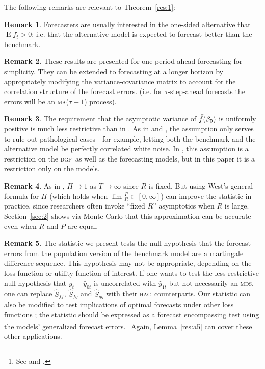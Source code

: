\documentclass[11pt,fleqn]{article}
\theoremstyle{definition}
\newtheorem{rem}{Remark}
\DeclareMathOperator{\E}{E}
\newcommand{\btrue}[1][]{\if#1*\hat\beta_{T+1}\else\beta_0\fi}
\newcommand{\dgp}{\textsc{dgp}}
\newcommand{\hac}{\textsc{hac}}
\newcommand{\ma}{\textsc{ma}}
\newcommand{\mds}{\textsc{mds}}
\begin{document}
The following remarks are relevant to Theorem~\ref{res:1}:

\begin{rem}
  Forecasters are usually interested in the one-sided alternative that
  $\E f_t > 0$; i.e. that the alternative model is expected
  to forecast better than the benchmark.
\end{rem}

\begin{rem}
  These results are presented for one-period-ahead forecasting for
  simplicity.  They can be extended to forecasting at a longer horizon
  by appropriately modifying the variance-covariance matrix to account
  for the correlation structure of the forecast errors. (i.e. for
  $\tau$-step-ahead forecasts the errors will be an \ma($\tau-1$) process).
\end{rem}

\begin{rem}
  The requirement that the asymptotic variance of $\bar f(\btrue)$ is
  uniformly positive is much less restrictive than in \cite{Wes:96}.
  As in \cite{GiW:06} and \citet{ClW:06,ClW:07}, the assumption only
  serves to rule out pathological cases---for example, letting both
  the benchmark and the alternative model be perfectly correlated white noise. In
  \citet{Wes:96}, this assumption is a restriction on the \dgp\ as
  well as the forecasting models, but in this paper it is a
  restriction only on the models.
\end{rem}

\begin{rem}
  As in \citet{Wes:96}, $\Pi \to 1$ as $T \to \infty$ since $R$ is
  fixed.  But using West's general formula for $\Pi$ (which holds when
  $\lim \tfrac{P}{R} \in [0,\infty]$) can improve the statistic in practice,
  since researchers often invoke ``fixed $R$'' asymptotics when $R$ is
  large.  Section~\ref{sec:2} shows via Monte Carlo that this
  approximation can be accurate even when $R$ and $P$ are equal.
\end{rem}

\begin{rem}
  The statistic we present tests the null hypothesis that the forecast
  errors from the population version of the benchmark model are a
  martingale difference sequence.  This hypothesis may not be
  appropriate, depending on the loss function or utility function of
  interest.  If one wants to test the less restrictive null hypothesis that
  $y_{t} - \hat{y}_{0t}$ is uncorrelated with $\hat{y}_{1t}$ but not
  necessarily an \mds, one can replace $\hat{S}_{ff}$, $\hat{S}_{fg}$
  and $\hat{S}_{gg}$ with their \hac\ counterparts.  
  Our statistic can also be modified to test implications of
  optimal forecasts under other loss functions
  \citep[see][]{PaT:07,PaT:07b}; the statistic should be expressed as
  a forecast encompassing test using the models' generalized forecast
  errors.\footnote{See \citet{HLN:98} and \citet[Section~4]{ClW:07}.}
  Again, Lemma~\ref{res:a5} can cover these other applications.
\end{rem}
\end{document}
